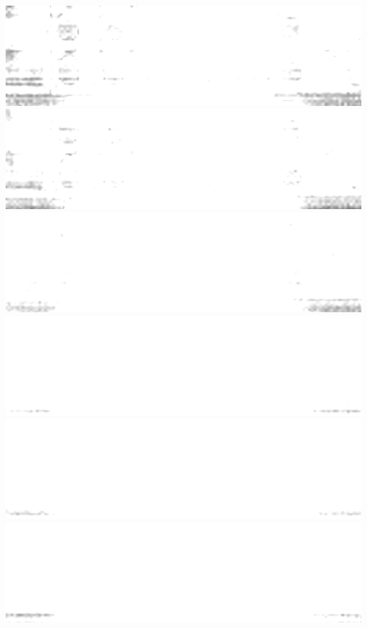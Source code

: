 \documentclass{beamer}
\begin{document}
\begin{frame}
        \includegraphics[height=0.023\textheight]{spatial-denoised/wavelet_den_55.png}
        \includegraphics[height=0.023\textheight]{spatial-denoised/wavelet_den_56.png}
        \includegraphics[height=0.023\textheight]{spatial-denoised/wavelet_den_57.png}
        \includegraphics[height=0.023\textheight]{spatial-denoised/wavelet_den_58.png}
        \includegraphics[height=0.023\textheight]{spatial-denoised/wavelet_den_59.png}
        \includegraphics[height=0.023\textheight]{spatial-denoised/wavelet_den_60.png}\\

\end{frame}
\end{document}
